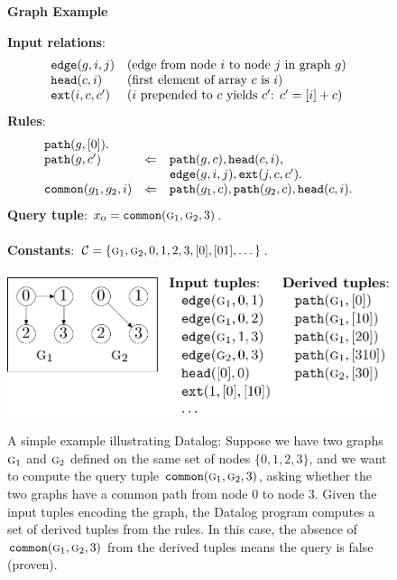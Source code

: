 \begin{figure}
\begin{center} {\bf Graph Example} \end{center}
{\bf Input relations}:
\[
\begin{array}{ll}
\text{\tt edge}(g,i,j) & \text{(edge from node $i$ to node $j$ in graph $g$)} \\
\text{\tt head}(c,i)   & \text{(first element of array $c$ is $i$)} \\
\text{\tt ext}(i,c,c') & \text{($i$ prepended to $c$ yields $c'$: $c' = [i]+c$)} \\
\end{array}
\]
{\bf Rules}:
\[
\begin{array}{lcl}
\text{\tt path}(g,[0]). & \\
\text{\tt path}(g,c')           &\Leftarrow& \text{\tt path}(g,c), \text{\tt head}(c,i), \\
                      &           & \text{\tt edge}(g, i, j), \text{\tt ext}(j, c, c'). \\
\text{\tt common}(g_1,g_2,i)    &\Leftarrow& \text{\tt path}(g_1,c), \text{\tt path}(g_2,c), \text{\tt head}(c,i). \\
\end{array}
\]
{\bf Query tuple}: $x_\text{\sc o} = \text{\tt common}(\text{\sc g}_1,\text{\sc g}_2,3)$. \\
\\
{\bf Constants}: $\mathcal{C} = \{ \text{\sc g}_1, \text{\sc g}_2, 0, 1, 2, 3, [0], [01], \dots \}$.
\\
\\
\includegraphics[scale=0.5]{figures/graphExample}
\caption{\label{fig:graphExample}
A simple example illustrating Datalog:
Suppose we have two graphs $\text{\sc g}_1$ and $\text{\sc g}_2$ defined on the same set of nodes $\{0,1,2,3\}$,
and we want to compute the query tuple $\text{\tt common}(\text{\sc g}_1,\text{\sc g}_2,3)$,
asking whether the two graphs have a common path from node $0$ to node $3$.
Given the input tuples encoding the graph,
the Datalog program computes a set of derived tuples from the rules.
In this case, the absence of $\text{\tt common}(\text{\sc g}_1,\text{\sc g}_2,3)$ from the derived tuples means the query is false (proven).
}
\end{figure}

